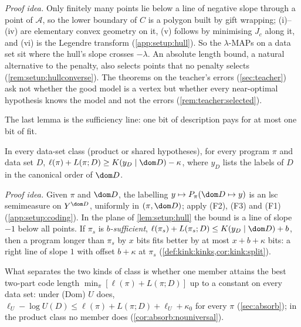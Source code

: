 \emph{Proof idea.} Only finitely many points lie below a line of negative slope through a point of $\mathcal A$, so the lower boundary of $C$ is a polygon built by gift wrapping; (i)--(iv) are elementary convex geometry on it, (v) follows by minimising $J_c$ along it, and (vi) is the Legendre transform (\cref{app:setup:hull}). So the $\lambda$-MAPs on a data set sit where the hull's slope crosses $-\lambda$. An absolute length bound, a natural alternative to the penalty, also selects points that no penalty selects (\cref{rem:setup:hullconverse}). The theorems on the teacher's errors (\cref{sec:teacher}) ask not whether the good model is a vertex but whether every near-optimal hypothesis knows the model and not the errors (\cref{rem:teacher:selected}).

The last lemma is the sufficiency line: one bit of description pays for at most one bit of fit.

\begin{lemma}\label{lem:setup:coding}
In every data-set class (product or shared hypotheses), for every program $\pi$ and data set $D$, $\ell(\pi)+L(\pi;D)\ge K(y_D\mid\dom D)-\kappa$, where $y_D$ lists the labels of $D$ in the canonical order of $\dom D$.
\end{lemma}

\emph{Proof idea.} Given $\pi$ and $\dom D$, the labelling $y\mapsto P_\pi(\dom D\mapsto y)$ is an lsc semimeasure on $Y^{\dom D}$, uniformly in $(\pi,\dom D)$; apply (F2), (F3) and (F1) (\cref{app:setup:coding}). In the plane of \cref{lem:setup:hull} the bound is a line of slope $-1$ below all points. If $\pi_s$ is \emph{$b$-sufficient}, $\ell(\pi_s)+L(\pi_s;D)\le K(y_D\mid\dom D)+b$, then a program longer than $\pi_s$ by $x$ bits fits better by at most $x+b+\kappa$ bits: a right line of slope $1$ with offset $b+\kappa$ at $\pi_s$ (\cref{def:kink:kinks,cor:kink:split}).

What separates the two kinds of class is whether one member attains the best two-part code length $\min_\pi[\ell(\pi)+L(\pi;D)]$ up to a constant on every data set: under (Dom) $U$ does, $\ell_U-\log U(D)\le\ell(\pi)+L(\pi;D)+\ell_U+\kappa_0$ for every $\pi$ (\cref{sec:absorb}); in the product class no member does (\cref{cor:absorb:nouniversal}).
